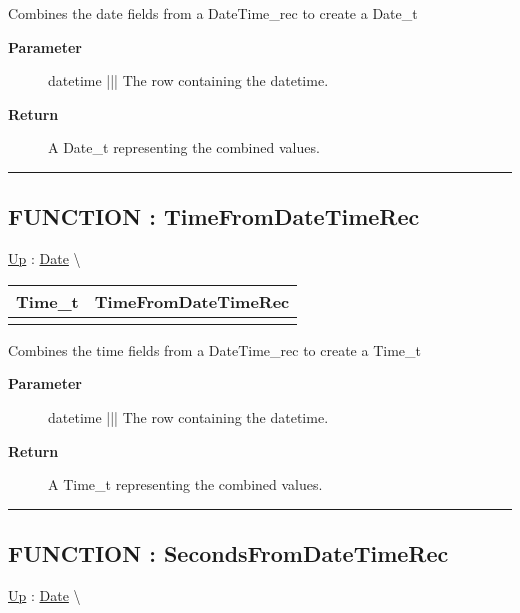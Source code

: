 \par
Combines the date fields from a DateTime\_rec to create a Date\_t

\par
\begin{description}
\item [\textbf{Parameter}] datetime ||| The row containing the datetime.
\item [\textbf{Return}] A Date\_t representing the combined values.
\end{description}

\rule{\linewidth}{0.5pt}
\subsection*{FUNCTION : TimeFromDateTimeRec}
\hypertarget{ecldoc:date.timefromdatetimerec}{}
\hyperlink{ecldoc:Date}{Up} :
\hspace{0pt} \hyperlink{ecldoc:Date}{Date} \textbackslash 

{\renewcommand{\arraystretch}{1.5}
\begin{tabularx}{\textwidth}{|>{\raggedright\arraybackslash}l|X|}
\hline
\hspace{0pt}Time\_t & TimeFromDateTimeRec \\
\hline
\multicolumn{2}{|>{\raggedright\arraybackslash}X|}{\hspace{0pt}(DateTime\_rec datetime)} \\
\hline
\end{tabularx}
}

\par
Combines the time fields from a DateTime\_rec to create a Time\_t

\par
\begin{description}
\item [\textbf{Parameter}] datetime ||| The row containing the datetime.
\item [\textbf{Return}] A Time\_t representing the combined values.
\end{description}

\rule{\linewidth}{0.5pt}
\subsection*{FUNCTION : SecondsFromDateTimeRec}
\hypertarget{ecldoc:date.secondsfromdatetimerec}{}
\hyperlink{ecldoc:Date}{Up} :
\hspace{0pt} \hyperlink{ecldoc:Date}{Date} \textbackslash 


